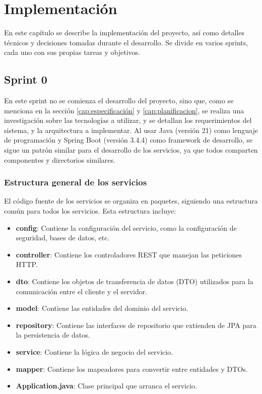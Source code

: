 \chapter{Implementación}\label{cap:implementacion}

En este capítulo se describe la implementación del proyecto, así como detalles técnicos y decisiones tomadas durante el desarrollo. Se divide en varios sprints, cada uno con sus propias tareas y objetivos.

\section{Sprint 0}

En este sprint no se comienza el desarrollo del proyecto, sino que, como se menciona en la sección \ref{cap:especificación} y \ref{cap:planificacion}, se realiza una investigación sobre las tecnologías a utilizar, y se detallan los requerimientos del sistema, y la arquitectura a implementar.
\newline\newline
Al usar Java (versión 21) como lenguaje de programación y Spring Boot (versión 3.4.4) como framework de desarrollo, se sigue un patrón similar para el desarrollo de los servicios, ya que todos comparten componentes y directorios similares.

\subsection{Estructura general de los servicios}

El código fuente de los servicios se organiza en paquetes, siguiendo una estructura común para todos los servicios. Esta estructura incluye:

\begin{itemize}
    \item \textbf{config}: Contiene la configuración del servicio, como la configuración de seguridad, bases de datos, etc.
    \item \textbf{controller}: Contiene los controladores REST que manejan las peticiones HTTP.
    \item \textbf{dto}: Contiene los objetos de transferencia de datos (DTO) utilizados para la comunicación entre el cliente y el servidor.
    \item \textbf{model}: Contiene las entidades del dominio del servicio.
    \item \textbf{repository}: Contiene las interfaces de repositorio que extienden de JPA para la persistencia de datos.
    \item \textbf{service}: Contiene la lógica de negocio del servicio.
    \item \textbf{mapper}: Contiene los mapeadores para convertir entre entidades y DTOs.
    \item \textbf{Application.java}: Clase principal que arranca el servicio.
\end{itemize}

